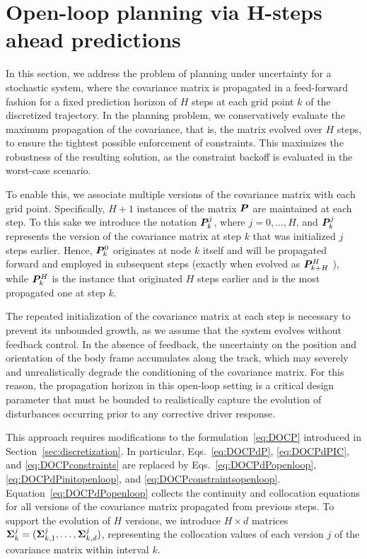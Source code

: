 \section{Open-loop planning via H-steps ahead predictions}
\label{sec:open_loop_planning}
In this section, we address the problem of planning under uncertainty for a stochastic system, where the covariance matrix is propagated in a feed-forward fashion for a fixed prediction horizon of $H$ steps at each grid point $k$ of the discretized trajectory. In the planning problem, we conservatively evaluate the maximum propagation of the covariance, that is, the matrix evolved over $H$ steps, to ensure the tightest possible enforcement of constraints. This maximizes the robustness of the resulting solution, as the constraint backoff is evaluated in the worst-case scenario.

To enable this, we associate multiple versions of the covariance matrix with each grid point. Specifically, $H+1$ instances of the matrix $\boldsymbol{P}$ are maintained at each step. To this sake we introduce the notation $\boldsymbol{P}_k^j$, where $j = 0, \ldots, H$, and $\boldsymbol{P}_k^j$ represents the version of the covariance matrix at step $k$ that was initialized $j$ steps earlier. Hence, $\boldsymbol{P}_k^0$ originates at node $k$ itself and will be propagated forward and employed in subsequent steps (exactly when evolved as $\boldsymbol{P}_{k+H}^H$ ), while $\boldsymbol{P}_k^H$ is the instance that originated $H$ steps earlier and is the most propagated one at step $k$. 

The repeated initialization of the covariance matrix at each step is necessary to prevent its unbounded growth, as we assume that the system evolves without feedback control.
In the absence of feedback, the uncertainty on the position and orientation of the body frame accumulates along the track, which may severely and unrealistically degrade the conditioning of the covariance matrix. 
For this reason, the propagation horizon in this open-loop setting is a critical design parameter that must be bounded to realistically capture the evolution of disturbances occurring prior to any corrective driver response.
 
This approach requires modifications to the formulation~\eqref{eq:DOCP} introduced in Section~\ref{sec:discretization}. In particular, Eqs.~\eqref{eq:DOCPdP}, \eqref{eq:DOCPdPIC}, and \eqref{eq:DOCPconstraints} are replaced by Eqs.~\eqref{eq:DOCPdPopenloop}, \eqref{eq:DOCPdPinitopenloop}, and \eqref{eq:DOCPconstraintsopenloop}. Equation~\eqref{eq:DOCPdPopenloop} collects the continuity and collocation equations for all versions of the covariance matrix propagated from previous steps. To support the evolution of $H$ versions, we introduce $H \times d$ matrices $\boldsymbol{\Sigma}_k^j = (\boldsymbol{\Sigma}_{k,1}^j, \ldots, \boldsymbol{\Sigma}_{k,d}^j)$, representing the collocation values of each version $j$ of the covariance matrix within interval $k$.


